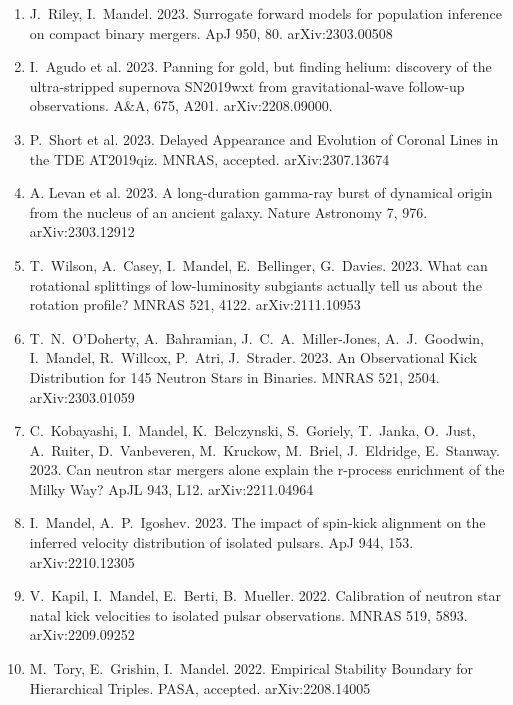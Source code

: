 \documentclass[margin,line]{res}
\begin{document}
\begin{resume}
\begin{enumerate}
\item J.~Riley, I.~Mandel.  2023. Surrogate forward models for population inference on compact binary mergers.  ApJ 950, 80. arXiv:2303.00508  

\item I.~Agudo et al. 2023.  Panning for gold, but finding helium: discovery of the ultra-stripped supernova SN2019wxt from gravitational-wave follow-up observations.  A\&A, 675, A201. arXiv:2208.09000.  

\item P.~Short et al. 2023.  Delayed Appearance and Evolution of Coronal Lines in the TDE AT2019qiz.  MNRAS, accepted.  arXiv:2307.13674

\item A. Levan et al. 2023.  A long-duration gamma-ray burst of dynamical origin from the nucleus of an ancient galaxy.  Nature Astronomy 7, 976. arXiv:2303.12912

\item T.~Wilson, A.~Casey, I.~Mandel, E.~Bellinger, G.~Davies.  2023.  What can rotational splittings of low-luminosity subgiants actually tell us about the rotation profile?  MNRAS 521, 4122.  arXiv:2111.10953

\item T.~N.~O'Doherty, A.~Bahramian, J.~C.~A.~Miller-Jones, A.~J.~Goodwin, I.~Mandel, R.~Willcox, P.~Atri, J.~Strader.  2023.  An Observational Kick Distribution for 145 Neutron Stars in Binaries.  MNRAS 521, 2504.   arXiv:2303.01059

\item C.~Kobayashi, I.~Mandel, K.~Belczynski, S.~Goriely, T.~Janka, O.~Just, A.~Ruiter, D.~Vanbeveren, M.~Kruckow, M.~Briel, J.~Eldridge, E.~Stanway.  2023.  Can neutron star mergers alone explain the r-process enrichment of the Milky Way?    ApJL 943, L12.  arXiv:2211.04964

\item I.~Mandel, A.~P.~Igoshev.  2023.  The impact of spin-kick alignment on the inferred velocity distribution of isolated pulsars.  ApJ 944, 153. arXiv:2210.12305

\item V.~Kapil, I.~Mandel, E.~Berti, B.~Mueller.  2022.  Calibration of neutron star natal kick velocities to isolated pulsar observations. MNRAS 519, 5893.  arXiv:2209.09252

\item M.~Tory, E.~Grishin, I.~Mandel. 2022. Empirical Stability Boundary for Hierarchical Triples. PASA, accepted.  arXiv:2208.14005


\end{enumerate}
\end{resume}
\end{document}
